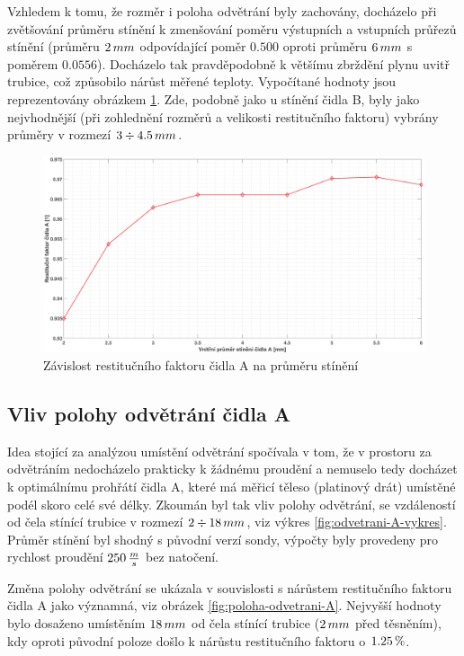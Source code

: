         \newpage
        Vzhledem k tomu, že rozměr i poloha odvětrání byly zachovány, docházelo při zvětšování průměru stínění k zmenšování poměru výstupních a vstupních průřezů stínění (průměru $2 \, mm$ odpovídající poměr $0.500$ oproti průměru $6 \, mm$ s poměrem $0.0556$). Docházelo tak pravděpodobně k většímu zbrždění plynu uvitř trubice, což způsobilo nárůst měřené teploty. Vypočítané hodnoty jsou reprezentovány obrázkem \ref{fig:prumer-stineni-A}. Zde, podobně jako u stínění čidla B, byly jako nejvhodnější (při zohlednění rozměrů a velikosti restitučního faktoru) vybrány průměry v rozmezí $3 \div 4.5 \, mm$.
        
        \begin{figure}[ht!]
            \centering
            \includegraphics*[width=\textwidth]{400_SIMULACE_KONSTRUKCNICH_UPRAV/Grafy/05_prumer_stineni_A}
            \caption{Závislost restitučního faktoru čidla A na průměru stínění}
            \label{fig:prumer-stineni-A}
        \end{figure}
    
   \newpage
     \subsection{Vliv polohy odvětrání čidla A}
        Idea stojící za analýzou umístění odvětrání spočívala v tom, že v prostoru za odvětráním nedocházelo prakticky k žádnému proudění a nemuselo tedy docházet k optimálnímu prohřátí čidla A, které má měřicí těleso (platinový drát) umístěné podél skoro celé své délky. Zkoumán byl tak vliv polohy odvětrání, se vzdáleností od čela stínící trubice v rozmezí $2 \div 18 \, mm$, viz výkres \ref{fig:odvetrani-A-vykres}. Průměr stínění byl shodný s původní verzí sondy, výpočty byly provedeny pro rychlost proudění $250 \, \frac{m}{s}$ bez natočení.

        Změna polohy odvětrání se ukázala v souvislosti s nárůstem restitučního faktoru čidla A jako významná, viz obrázek \ref{fig:poloha-odvetrani-A}. Nejvyšší hodnoty bylo dosaženo umístěním $18 \, mm$ od čela stínící trubice ($2 \, mm$ před těsněním), kdy oproti původní poloze došlo k nárůstu restitučního faktoru o $1.25 \, \%$.
        
